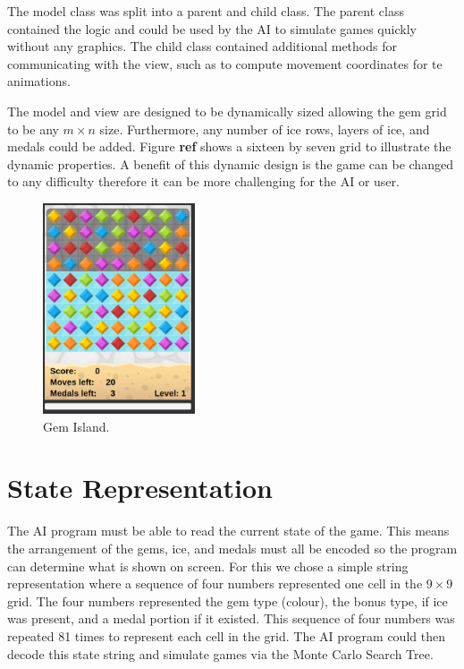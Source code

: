 \documentclass{bhamthesis}
\theoremstyle{definition}
\begin{document}
The model class was split into a parent and child class. The parent class contained the logic and could be used by the AI to simulate games quickly without any graphics. The child class contained additional methods for communicating with the view, such as to compute movement coordinates for te animations.

The model and view are designed to be dynamically sized allowing the gem grid to be any $m \times n$ size. Furthermore, any number of ice rows, layers of ice, and medals could be added. Figure \textbf{ref} shows a sixteen by seven grid to illustrate the dynamic properties. A benefit of this dynamic design is the game can be changed to any difficulty therefore it can be more challenging for the AI or user.


\begin{figure}
	\centering
	\includegraphics[width=0.4\textwidth]{media/img/screen2}
	\caption{Gem Island.}\label{f:gemIslandGame}
\end{figure}

\section{State Representation}\label{s:state}
The AI program must be able to read the current state of the game. This means the arrangement of the gems, ice, and medals must all be encoded so the program can determine what is shown on screen. For this we chose a simple string representation where a sequence of four numbers represented one cell in the $9 \times 9$ grid. The four numbers represented the gem type (colour), the bonus type, if ice was present, and a medal portion if it existed. This sequence of four numbers was repeated 81 times to represent each cell in the grid. The AI program could then decode this state string and simulate games via the Monte Carlo Search Tree.
\end{document}
